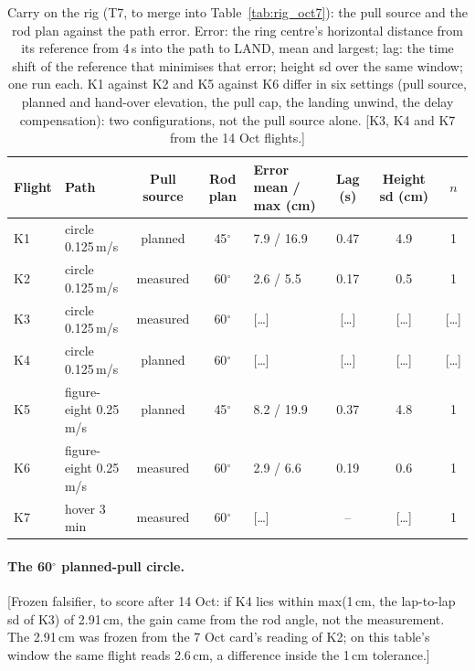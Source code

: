 \begin{table}[htbp]
  \centering
  \footnotesize
  \caption{Carry on the rig (T7, to merge into Table~\ref{tab:rig_oct7}): the pull source and the rod plan against
  the path error. Error: the ring centre's horizontal distance from its reference from 4\,s into the path to LAND,
  mean and largest; lag: the time shift of the reference that minimises that error; height sd over the same window;
  one run each. K1 against K2 and K5 against K6 differ in six settings (pull source, planned and hand-over elevation,
  the pull cap, the landing unwind, the delay compensation): two configurations, not the pull source alone. [K3, K4
  and K7 from the 14 Oct flights.]}
  \label{tab:T7}
  \begin{tabularx}{\textwidth}{lYccYccc}
    \toprule
    Flight & Path & Pull source & Rod plan & Error mean / max (cm) & Lag (s) & Height sd (cm) & $n$ \\
    \midrule
    K1 & circle 0.125\,m/s & planned & 45$^\circ$ & 7.9 / 16.9 & 0.47 & 4.9 & 1 \\ %
    K2 & circle 0.125\,m/s & measured & 60$^\circ$ & 2.6 / 5.5 & 0.17 & 0.5 & 1 \\ %
    K3 & circle 0.125\,m/s & measured & 60$^\circ$ & [\dots] & [\dots] & [\dots] & [\dots] \\ %
    K4 & circle 0.125\,m/s & planned & 60$^\circ$ & [\dots] & [\dots] & [\dots] & [\dots] \\ %
    K5 & figure-eight 0.25\,m/s & planned & 45$^\circ$ & 8.2 / 19.9 & 0.37 & 4.8 & 1 \\ %
    K6 & figure-eight 0.25\,m/s & measured & 60$^\circ$ & 2.9 / 6.6 & 0.19 & 0.6 & 1 \\ %
    K7 & hover 3 min & measured & 60$^\circ$ & [\dots] & -- & [\dots] & 1 \\ %
    \bottomrule
  \end{tabularx}
\end{table}

\paragraph{The 60$^\circ$ planned-pull circle.} [Frozen falsifier, to score after 14 Oct: if K4 lies within
max(1\,cm, the lap-to-lap sd of K3) of 2.91\,cm, the gain came from the rod angle, not the measurement. The 2.91\,cm
was frozen from the 7 Oct card's reading of K2; on this table's window the same flight reads 2.6\,cm, a difference
inside the 1\,cm tolerance.]

